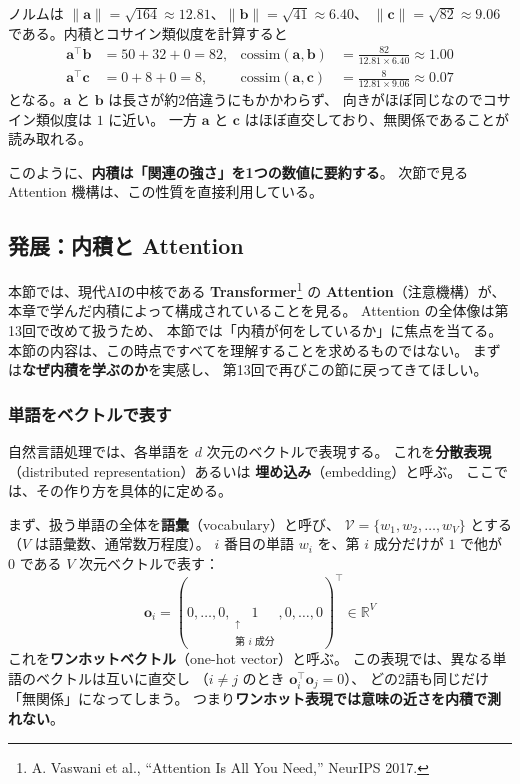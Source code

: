 ノルムは $\|\bm{a}\| = \sqrt{164} \approx 12.81$、$\|\bm{b}\| = \sqrt{41} \approx 6.40$、
$\|\bm{c}\| = \sqrt{82} \approx 9.06$ である。内積とコサイン類似度を計算すると
\begin{align*}
  \bm{a}^\top \bm{b} &= 50 + 32 + 0 = 82,
    &\mathrm{cossim}(\bm{a}, \bm{b}) &= \frac{82}{12.81 \times 6.40} \approx 1.00 \\
  \bm{a}^\top \bm{c} &= 0 + 8 + 0 = 8,
    &\mathrm{cossim}(\bm{a}, \bm{c}) &= \frac{8}{12.81 \times 9.06} \approx 0.07
\end{align*}
となる。$\bm{a}$ と $\bm{b}$ は長さが約2倍違うにもかかわらず、
向きがほぼ同じなのでコサイン類似度は $1$ に近い。
一方 $\bm{a}$ と $\bm{c}$ はほぼ直交しており、無関係であることが読み取れる。

このように、\textbf{内積は「関連の強さ」を1つの数値に要約する}。
次節で見る Attention 機構は、この性質を直接利用している。


\subsection{発展：内積と Attention}

本節では、現代AIの中核である \textbf{Transformer}\footnote{%
A. Vaswani et al., ``Attention Is All You Need,'' NeurIPS 2017.}
の \textbf{Attention}（注意機構）が、
本章で学んだ内積によって構成されていることを見る。
Attention の全体像は第13回で改めて扱うため、
本節では「内積が何をしているか」に焦点を当てる。
本節の内容は、この時点ですべてを理解することを求めるものではない。
まずは\textbf{なぜ内積を学ぶのか}を実感し、
第13回で再びこの節に戻ってきてほしい。

\subsubsection{単語をベクトルで表す}

自然言語処理では、各単語を $d$ 次元のベクトルで表現する。
これを\textbf{分散表現}（distributed representation）あるいは
\textbf{埋め込み}（embedding）と呼ぶ。
ここでは、その作り方を具体的に定める。

まず、扱う単語の全体を\textbf{語彙}（vocabulary）と呼び、
$\mathcal{V} = \{ w_1, w_2, \ldots, w_V \}$ とする（$V$ は語彙数、通常数万程度）。
$i$ 番目の単語 $w_i$ を、第 $i$ 成分だけが $1$ で他が $0$ である
$V$ 次元ベクトルで表す：
\begin{equation}
  \bm{o}_i = (0, \ldots, 0, \underset{\substack{\uparrow \\ \text{第 $i$ 成分}}}{1}, 0, \ldots, 0)^\top \in \mathbb{R}^{V}
\end{equation}
これを\textbf{ワンホットベクトル}（one-hot vector）と呼ぶ。
この表現では、異なる単語のベクトルは互いに直交し
（$i \neq j$ のとき $\bm{o}_i^\top \bm{o}_j = 0$）、
どの2語も同じだけ「無関係」になってしまう。
つまり\textbf{ワンホット表現では意味の近さを内積で測れない}。

